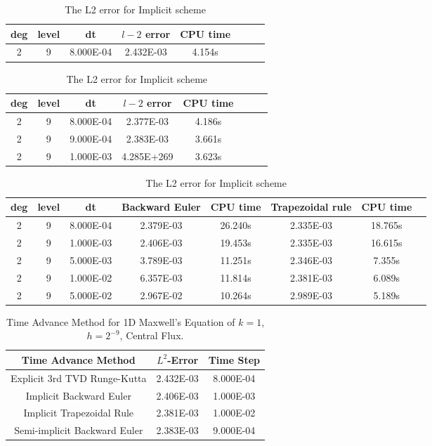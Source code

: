 \documentclass[a4paper]{article}
\begin{document}
\begin{table}[htbp]
\caption{\label{tab:test}1D: The L2 error for Explicit 3rd Runge Kutta with time period=1.5}
\centering
\vspace{5pt}
\begin{tabular}{cccccccc}
\toprule
deg & level&dt&$l-2$ error &CPU time \\
\midrule
2&9&8.000E-04&2.432E-03&4.154s\\
\bottomrule
\end{tabular}
\caption{\label{tab:test}The L2 error for Semi-Implicit Backward Euler}
\centering
\vspace{5pt}

\begin{tabular}{cccccccc}
\toprule
deg & level&dt&$l-2$ error &CPU time \\
\midrule
2&9&8.000E-04&2.377E-03&4.186s\\
2&9&9.000E-04&2.383E-03&3.661s\\
2&9&1.000E-03&4.285E+269&3.623s\\
\bottomrule
\end{tabular}


\caption{\label{tab:test}The L2 error for Implicit scheme}
\centering
\vspace{5pt}

\begin{tabular}{cccccccc}
\toprule
deg & level&dt&Backward Euler &CPU time &Trapezoidal rule&CPU time\\
\midrule
2&9&8.000E-04&2.379E-03&26.240s&2.335E-03&18.765s\\
2&9&1.000E-03&2.406E-03&19.453s&2.335E-03&16.615s\\
2&9&5.000E-03&3.789E-03&11.251s&2.346E-03&7.355s\\
2&9&1.000E-02&6.357E-03&11.814s&2.381E-03&6.089s\\
2&9&5.000E-02&2.967E-02&10.264s&2.989E-03&5.189s\\
\bottomrule
\end{tabular}


\end{table}


\begin{table}
\caption{Time Advance Method for 1D Maxwell's Equation of $k=1$, $h=2^{-9}$, Central Flux.}\vspace{5pt}
\centering
\begin{tabular}{c|c|c}\toprule\hline
Time Advance Method & $L^2$-Error & Time Step \\ \hline
Explicit 3rd TVD Runge-Kutta  & 2.432E-03 & 8.000E-04\\ %
Implicit Backward Euler & 2.406E-03 & 1.000E-03\\ %
Implicit Trapezoidal Rule & 2.381E-03 & 1.000E-02\\ %
Semi-implicit Backward Euler & 2.383E-03 & 9.000E-04\\ \hline
\bottomrule
\end{tabular}
\end{table}
\end{document}
